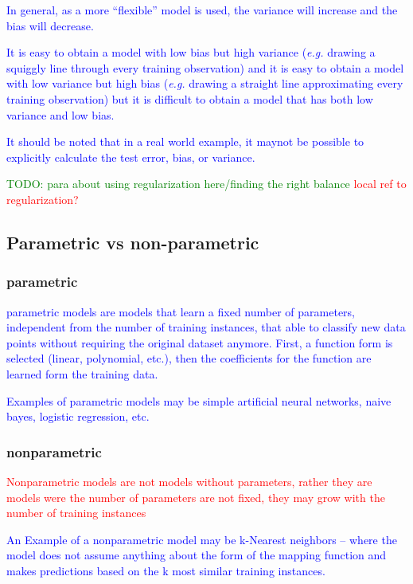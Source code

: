 \textcolor{blue}{In general, as a more ``flexible'' model is used, the variance will increase and the bias will decrease.}


\textcolor{blue}{It is easy to obtain a model with low bias but high variance (\emph{e.g.} drawing a squiggly line through every training observation) and it is easy to obtain a model with low variance but high bias (\emph{e.g.} drawing a straight line approximating every training observation) but it is difficult to obtain a model that has both low variance and low bias.}

\textcolor{blue}{It should be noted that in a real world example, it maynot be possible to explicitly calculate the test error, bias, or variance.}

\textcolor{green}{TODO: para about using regularization here/finding the right balance \textcolor{red}{local ref to regularization?}}

\subsection{Parametric vs non-parametric}

\subsubsection{parametric}

\textcolor{blue}{parametric models are models that learn a fixed number of parameters, independent from the number of training instances, that able to classify new data points without requiring the original dataset anymore. First, a function form is selected (linear, polynomial, etc.), then the coefficients for the function are learned form the training data.}
	
\textcolor{blue}{Examples of parametric models may be simple artificial neural networks, naive bayes, logistic regression, etc.}

\subsubsection{nonparametric}

\textcolor{red}{Nonparametric models are not models without parameters, rather they are models were the number of parameters are not fixed, they may grow with the number of training instances}

\textcolor{blue}{An Example of a nonparametric model may be k-Nearest neighbors -- where the model does not assume anything about the form of the mapping function and makes predictions based on the k most similar training instances.}

